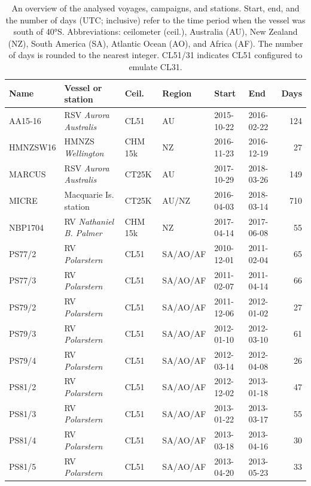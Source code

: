 \documentclass[12pt,a4paper]{article}
\begin{document}
\begin{table}[p!]
\caption{
An overview of the analysed voyages, campaigns, and stations. Start, end, and
the number of days (UTC; inclusive) refer to the time period when the vessel
was south of 40°S.  Abbreviations: ceilometer (ceil.), Australia (AU), New
Zealand (NZ), South America (SA), Atlantic Ocean (AO), and Africa (AF). The
number of days is rounded to the nearest integer. CL51/31 indicates CL51
configured to emulate CL31.
}
\label{tab:voyages}
\small
\begin{tabular}{llllllr}
\textbf{Name} & \textbf{Vessel or station} & \textbf{Ceil.} & \textbf{Region} & \textbf{Start} & \textbf{End} & \textbf{Days}\\
\hline
AA15-16  & RSV \emph{Aurora Australis}   & CL51    & AU       & 2015-10-22 & 2016-02-22 & 124 \\
HMNZSW16 & HMNZS \emph{Wellington}       & CHM 15k & NZ       & 2016-11-23 & 2016-12-19 & 27 \\
MARCUS   & RSV \emph{Aurora Australis}   & CT25K   & AU       & 2017-10-29 & 2018-03-26 & 149 \\
MICRE    & Macquarie Is. station         & CT25K   & AU/NZ    & 2016-04-03 & 2018-03-14 & 710 \\
NBP1704  & RV \emph{Nathaniel B. Palmer} & CHM 15k & NZ       & 2017-04-14 & 2017-06-08 & 55 \\
PS77/2   & RV \emph{Polarstern}          & CL51    & SA/AO/AF & 2010-12-01 & 2011-02-04 & 65 \\
PS77/3   & RV \emph{Polarstern}          & CL51    & SA/AO/AF & 2011-02-07 & 2011-04-14 & 66 \\
PS79/2   & RV \emph{Polarstern}          & CL51    & SA/AO/AF & 2011-12-06 & 2012-01-02 & 27 \\
PS79/3   & RV \emph{Polarstern}          & CL51    & SA/AO/AF & 2012-01-10 & 2012-03-10 & 61 \\
PS79/4   & RV \emph{Polarstern}          & CL51    & SA/AO/AF & 2012-03-14 & 2012-04-08 & 26 \\
PS81/2   & RV \emph{Polarstern}          & CL51    & SA/AO/AF & 2012-12-02 & 2013-01-18 & 47 \\
PS81/3   & RV \emph{Polarstern}          & CL51    & SA/AO/AF & 2013-01-22 & 2013-03-17 & 55 \\
PS81/4   & RV \emph{Polarstern}          & CL51    & SA/AO/AF & 2013-03-18 & 2013-04-16 & 30 \\
PS81/5   & RV \emph{Polarstern}          & CL51    & SA/AO/AF & 2013-04-20 & 2013-05-23 & 33 \\

\end{tabular}
\end{table}
\end{document}
